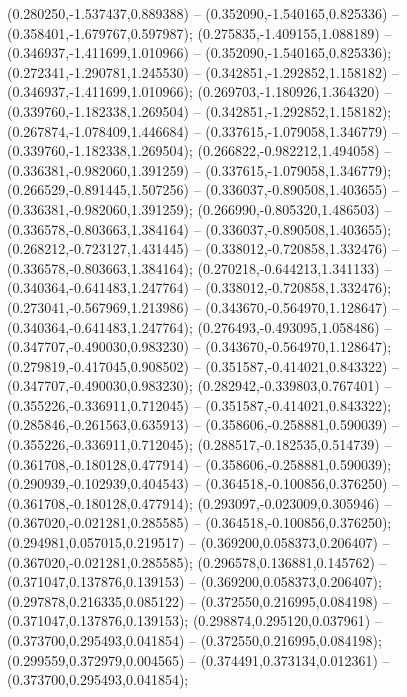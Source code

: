  (0.280250,-1.537437,0.889388) -- (0.352090,-1.540165,0.825336) -- (0.358401,-1.679767,0.597987);
 (0.275835,-1.409155,1.088189) -- (0.346937,-1.411699,1.010966) -- (0.352090,-1.540165,0.825336);
 (0.272341,-1.290781,1.245530) -- (0.342851,-1.292852,1.158182) -- (0.346937,-1.411699,1.010966);
 (0.269703,-1.180926,1.364320) -- (0.339760,-1.182338,1.269504) -- (0.342851,-1.292852,1.158182);
 (0.267874,-1.078409,1.446684) -- (0.337615,-1.079058,1.346779) -- (0.339760,-1.182338,1.269504);
 (0.266822,-0.982212,1.494058) -- (0.336381,-0.982060,1.391259) -- (0.337615,-1.079058,1.346779);
 (0.266529,-0.891445,1.507256) -- (0.336037,-0.890508,1.403655) -- (0.336381,-0.982060,1.391259);
 (0.266990,-0.805320,1.486503) -- (0.336578,-0.803663,1.384164) -- (0.336037,-0.890508,1.403655);
 (0.268212,-0.723127,1.431445) -- (0.338012,-0.720858,1.332476) -- (0.336578,-0.803663,1.384164);
 (0.270218,-0.644213,1.341133) -- (0.340364,-0.641483,1.247764) -- (0.338012,-0.720858,1.332476);
 (0.273041,-0.567969,1.213986) -- (0.343670,-0.564970,1.128647) -- (0.340364,-0.641483,1.247764);
 (0.276493,-0.493095,1.058486) -- (0.347707,-0.490030,0.983230) -- (0.343670,-0.564970,1.128647);
 (0.279819,-0.417045,0.908502) -- (0.351587,-0.414021,0.843322) -- (0.347707,-0.490030,0.983230);
 (0.282942,-0.339803,0.767401) -- (0.355226,-0.336911,0.712045) -- (0.351587,-0.414021,0.843322);
 (0.285846,-0.261563,0.635913) -- (0.358606,-0.258881,0.590039) -- (0.355226,-0.336911,0.712045);
 (0.288517,-0.182535,0.514739) -- (0.361708,-0.180128,0.477914) -- (0.358606,-0.258881,0.590039);
 (0.290939,-0.102939,0.404543) -- (0.364518,-0.100856,0.376250) -- (0.361708,-0.180128,0.477914);
 (0.293097,-0.023009,0.305946) -- (0.367020,-0.021281,0.285585) -- (0.364518,-0.100856,0.376250);
 (0.294981,0.057015,0.219517) -- (0.369200,0.058373,0.206407) -- (0.367020,-0.021281,0.285585);
 (0.296578,0.136881,0.145762) -- (0.371047,0.137876,0.139153) -- (0.369200,0.058373,0.206407);
 (0.297878,0.216335,0.085122) -- (0.372550,0.216995,0.084198) -- (0.371047,0.137876,0.139153);
 (0.298874,0.295120,0.037961) -- (0.373700,0.295493,0.041854) -- (0.372550,0.216995,0.084198);
 (0.299559,0.372979,0.004565) -- (0.374491,0.373134,0.012361) -- (0.373700,0.295493,0.041854);
